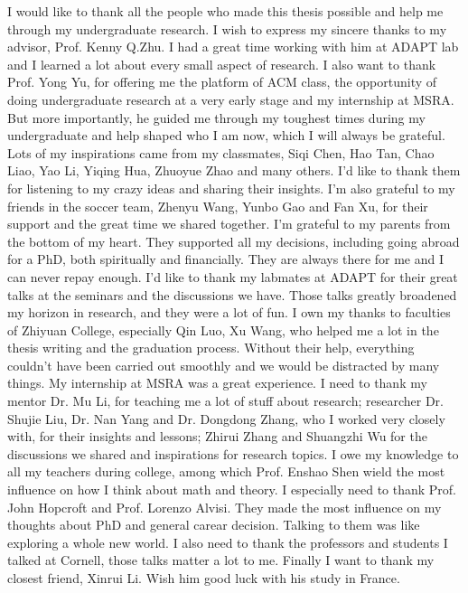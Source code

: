I would like to thank all the people who made this thesis possible and help me through my undergraduate research.
I wish to express my sincere thanks to my advisor, Prof. Kenny Q.Zhu. I had a great time working with him at ADAPT lab and I learned a lot about every small aspect of research.
I also want to thank Prof. Yong Yu, for offering me the platform of ACM class, the opportunity of doing undergraduate research at a very early stage and my internship at MSRA. But more importantly, he guided me through my toughest times during my undergraduate and help shaped who I am now, which I will always be grateful.
Lots of my inspirations came from my classmates, Siqi Chen, Hao Tan, Chao Liao, Yao Li, Yiqing Hua, Zhuoyue Zhao and many others. I'd like to thank them for listening to my crazy ideas and sharing their insights. 
I'm also grateful to my friends in the soccer team, Zhenyu Wang, Yunbo Gao and Fan Xu, for their support and the great time we shared together.
I'm grateful to my parents from the bottom of my heart. They supported all my decisions, including going abroad for a PhD, both spiritually and financially. They are always there for me and I can never repay enough.
I'd like to thank my labmates at ADAPT for their great talks at the seminars and the discussions we have. Those talks greatly broadened my horizon in research, and they were a lot of fun.
I own my thanks to faculties of Zhiyuan College, especially Qin Luo, Xu Wang, who helped me a lot in the thesis writing and the graduation process. Without their help, everything couldn't have been carried out smoothly and we would be distracted by many things.
My internship at MSRA was a great experience. I need to thank my mentor Dr. Mu Li, for teaching me a lot of stuff about research; researcher Dr. Shujie Liu, Dr. Nan Yang and Dr. Dongdong Zhang, who I worked very closely with, for their insights and lessons; Zhirui Zhang and Shuangzhi Wu for the discussions we shared and inspirations for research topics.
I owe my knowledge to all my teachers during college, among which Prof. Enshao Shen wield the most influence on how I think about math and theory. I especially need to thank Prof. John Hopcroft and Prof. Lorenzo Alvisi. They made the most influence on my thoughts about PhD and general carear decision. Talking to them was like exploring a whole new world. I also need to thank the professors and students I talked at Cornell, those talks matter a lot to me.
Finally I want to thank my closest friend, Xinrui Li. Wish him good luck with his study in France.
